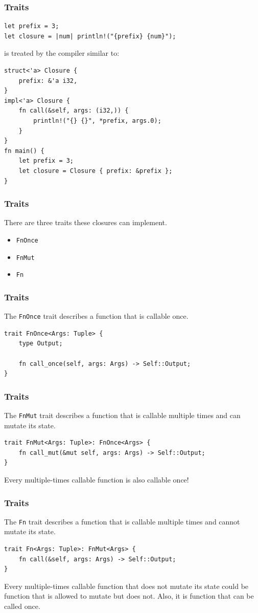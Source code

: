 \begin{frame}[fragile]
    \frametitle{Traits}
    \begin{verbatim}
let prefix = 3;
let closure = |num| println!("{prefix} {num}");
    \end{verbatim}
    \vfill
    is treated by the compiler similar to:
    \pause
    \vfill
    \begin{verbatim}
struct<'a> Closure {
    prefix: &'a i32,
}
impl<'a> Closure {
    fn call(&self, args: (i32,)) {
        println!("{} {}", *prefix, args.0);
    }
}
fn main() {
    let prefix = 3;
    let closure = Closure { prefix: &prefix };
}
    \end{verbatim}
\end{frame}

\begin{frame}[fragile]
    \frametitle{Traits}
    There are three traits these closures can implement.
    \vfill
    \begin{itemize}
        \item \texttt{FnOnce}
        \item \texttt{FnMut}
        \item \texttt{Fn}
    \end{itemize}
\end{frame}

\begin{frame}[fragile]
    \frametitle{Traits}
    The \texttt{FnOnce} trait describes a function that is callable once.
    \vfill
    \begin{verbatim}
trait FnOnce<Args: Tuple> {
    type Output;

    fn call_once(self, args: Args) -> Self::Output;
}
    \end{verbatim}
\end{frame}

\begin{frame}[fragile]
    \frametitle{Traits}
    The \texttt{FnMut} trait describes a function that is callable multiple times and can mutate its state.
    \vfill
    \begin{verbatim}
trait FnMut<Args: Tuple>: FnOnce<Args> {
    fn call_mut(&mut self, args: Args) -> Self::Output;
}
    \end{verbatim}
    \pause
    \vfill
    Every multiple-times callable function is also callable once!
\end{frame}

\begin{frame}[fragile]
    \frametitle{Traits}
    The \texttt{Fn} trait describes a function that is callable multiple times and cannot mutate its state.
    \vfill
    \begin{verbatim}
trait Fn<Args: Tuple>: FnMut<Args> {
    fn call(&self, args: Args) -> Self::Output;
}
    \end{verbatim}
    \pause
    \vfill
    Every multiple-times callable function that does not mutate its state could be function that is allowed to mutate but does not.
    Also, it is function that can be called once.
\end{frame}

